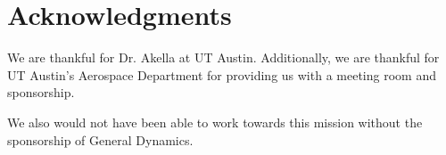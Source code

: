 \documentclass[12pt]{article}
\begin{document}
\section{Acknowledgments}
We are thankful for Dr. Akella at UT Austin. Additionally, we are thankful for UT Austin's Aerospace Department for providing us with a meeting room and sponsorship. 

We also would not have been able to work towards this mission without the sponsorship of General Dynamics. 

 
\end{document}
